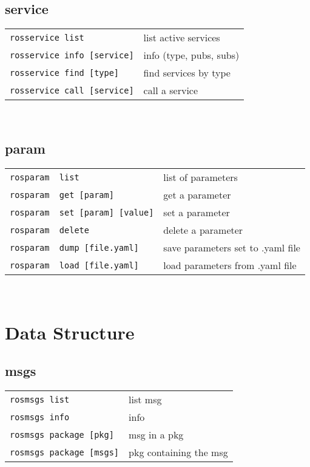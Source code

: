 \documentclass[10pt,landscape,a4paper]{article}
\begin{document}
\begin{multicols}{3}
    
        \subsection{service}
            \begin{tabular}{@{}ll@{}}
                \verb!rosservice list!    & list active services \\
                \verb!rosservice info [service]!    & info (type, pubs, subs) \\
                \verb!rosservice find [type]!    & find services by type \\
                \verb!rosservice call [service]!    & call a service \\
            \end{tabular} \\
            
            
        \subsection{param}
            \begin{tabular}{@{}ll@{}}
                \verb!rosparam  list!    & list of parameters \\
                \verb!rosparam  get [param]!    & get a parameter \\
                \verb!rosparam  set [param] [value]!    & set a parameter \\
                \verb!rosparam  delete!    & delete a parameter \\
                \verb!rosparam  dump [file.yaml]!    & save parameters set to .yaml file \\
                \verb!rosparam  load [file.yaml]!    & load parameters from .yaml file \\
            \end{tabular} \\
            
            
        \section{Data Structure}
        
            \subsection{msgs}
                \begin{tabular}{@{}ll@{}}
                    \verb!rosmsgs list!    & list msg \\
                    \verb!rosmsgs info!    & info \\
                    \verb!rosmsgs package [pkg]!    & msg in a pkg \\
                    \verb!rosmsgs package [msgs]!    & pkg containing the msg \\
                \end{tabular} \\
        

\end{multicols}
\end{document}
